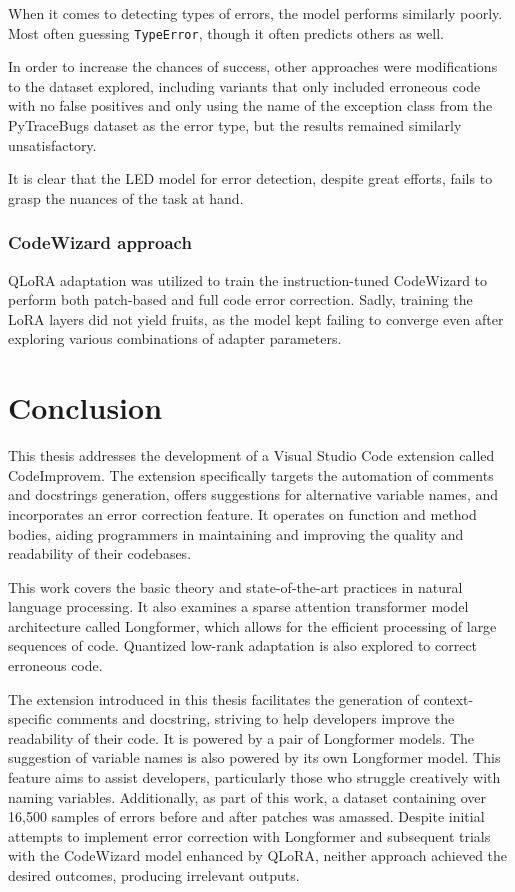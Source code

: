         When it comes to detecting types of errors, the model performs similarly poorly. Most often guessing \texttt{TypeError}, though it often predicts others as well.

        In order to increase the chances of success, other approaches were modifications to the dataset explored, including variants that only included erroneous code with no false positives and only using the name of the exception class from the PyTraceBugs dataset as the error type, but the results remained similarly unsatisfactory.

        It is clear that the LED model for error detection, despite great efforts, fails to grasp the nuances of the task at hand.

        \subsection{CodeWizard approach}

        QLoRA adaptation was utilized to train the instruction-tuned CodeWizard to perform both patch-based and full code error correction. Sadly, training the LoRA layers did not yield fruits, as the model kept failing to converge even after exploring various combinations of adapter parameters. 

    
\chapter{Conclusion}
    This thesis addresses the development of a Visual Studio Code extension called CodeImprovem. The extension specifically targets the automation of comments and docstrings generation, offers suggestions for alternative variable names, and incorporates an error correction feature. It operates on function and method bodies, aiding programmers in maintaining and improving the quality and readability of their codebases.

    This work covers the basic theory and state-of-the-art practices in natural language processing. It also examines a sparse attention transformer model architecture called Longformer, which allows for the efficient processing of large sequences of code. Quantized low-rank adaptation is also explored to correct erroneous code.
    
    The extension introduced in this thesis facilitates the generation of context-specific comments and docstring, striving to help developers improve the readability of their code. It is powered by a pair of Longformer models. The suggestion of variable names is also powered by its own Longformer model. This feature aims to assist developers, particularly those who struggle creatively with naming variables. Additionally, as part of this work, a dataset containing over 16,500 samples of errors before and after patches was amassed. Despite initial attempts to implement error correction with Longformer and subsequent trials with the CodeWizard model enhanced by QLoRA, neither approach achieved the desired outcomes, producing irrelevant outputs. 
    
